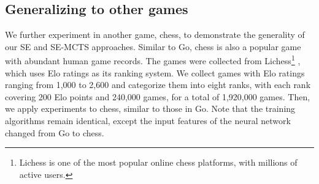 


%

\subsection{Generalizing to other games}
\label{subsec:generality}

We further experiment in another game, chess, to demonstrate the generality of our SE and SE-MCTS approaches.
Similar to Go, chess is also a popular game with abundant human game records.
The games were collected from Lichess\footnote{Lichess is one of the most popular online chess platforms, with millions of active users.} \citep{lichess_2024}, which uses Elo ratings as its ranking system.
We collect games with Elo ratings ranging from 1,000 to 2,600 and categorize them into eight ranks, with each rank covering 200 Elo points and 240,000 games, for a total of 1,920,000 games.
Then, we apply experiments to chess, similar to those in Go.
Note that the training algorithms remain identical, except the input features of the neural network changed from Go to chess.

